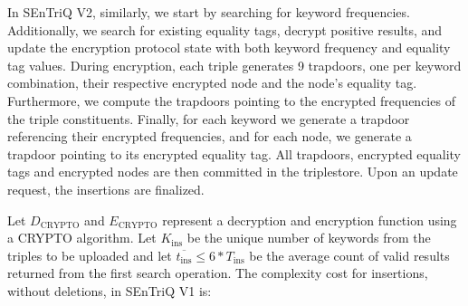 In \gls{SEnTriQ} V2, similarly, we start by searching for keyword frequencies. Additionally, we search for existing equality tags, decrypt positive results, and update the encryption protocol state with both keyword frequency and equality tag values. During encryption, each triple generates 9 trapdoors, one per keyword combination, their respective encrypted node and the node's equality tag. Furthermore, we compute the trapdoors pointing to the
encrypted frequencies of the triple constituents. Finally, for each keyword we generate a trapdoor referencing their encrypted frequencies, and for each node, we generate a trapdoor pointing to its encrypted equality tag. All trapdoors, encrypted equality tags and encrypted nodes are then committed in the triplestore. Upon an update request, the insertions are finalized.

Let $D_{\text{CRYPTO}}$ and $E_{\text{CRYPTO}}$ represent a decryption and encryption function using a CRYPTO algorithm. Let $K_{\text{ins}}$ be the unique number of keywords from the triples to be uploaded and let $\overline{t_{\text{ins}}} \leq 6 * T_{\text{ins}}$ be the average count of valid results returned from the first search operation. The complexity cost for insertions, without deletions, in \gls{SEnTriQ} V1 is:

